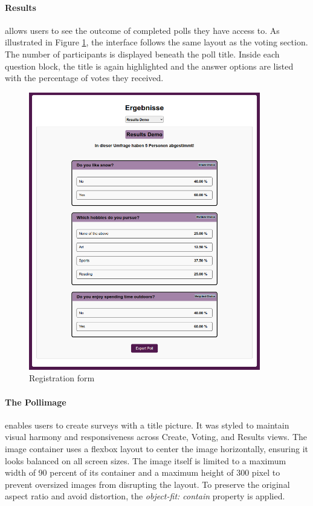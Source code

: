 \documentclass[a4paper,12pt]{report}
\begin{document}
\paragraph{Results} allows users to see the outcome of completed polls they have access to. As illustrated in Figure \ref{fig:results_view}, the interface follows the same layout as the voting section. The number of participants is displayed beneath the poll title. Inside each question block, the title is again highlighted and the answer options are listed with the percentage of votes they received.
\begin{figure}[H]
	\centering
	\includegraphics[width=0.9\textwidth]{pics/results_view.png}
	\caption{Registration form}
	\label{fig:results_view}
\end{figure}
\paragraph{The Pollimage} enables users to create surveys with a title picture. It was styled to maintain visual harmony and responsiveness across Create, Voting, and Results views. The image container uses a flexbox layout to center the image horizontally, ensuring it looks balanced on all screen sizes. The image itself is limited to a maximum width of 90 percent of its container and a maximum height of 300 pixel to prevent oversized images from disrupting the layout. To preserve the original aspect ratio and avoid distortion, the \textit{object-fit: contain} property is applied. \parencite{cssobjectfit} \\ \\
\end{document}
